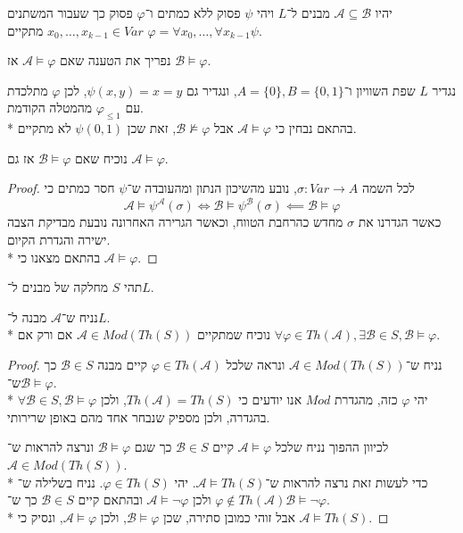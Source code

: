 \question{}
יהיו $\mathcal{A} \subseteq \mathcal{B}$ מבנים ל־$L$ ויהי $\psi$ פסוק ללא כמתים ו־$\varphi$ פסוק כך שעבור המשתנים $x_0, \dots, x_{k - 1} \in Var$ מתקיים $\varphi = \forall x_0, \dots, \forall x_{k - 1} \psi$.

\subquestion{}
נפריך את הטענה שאם $\mathcal{A} \models \varphi$ אז $\mathcal{B} \models \varphi$.
\begin{solution}
	נגדיר $L$ שפת השוויון ו־$A = \{0\}, B = \{0, 1\}$, ונגדיר גם $\psi(x, y) = x = y$, לכן $\varphi$ מתלכדת עם $\varphi_{\le 1}$ מהמטלה הקודמת. \\*
	בהתאם נבחין כי $\mathcal{A} \models \varphi$ אבל $\mathcal{B} \not\models \varphi$, זאת שכן $\psi(0, 1)$ לא מתקיים.
\end{solution}

\subquestion{}
נוכיח שאם $\mathcal{B} \models \varphi$ אז גם $\mathcal{A} \models \varphi$.
\begin{proof}
	לכל השמה $\sigma : Var \to A$, נובע מהשיכון הנתון ומהעובדה ש־$\psi$ חסר כמתים כי
	\[
		\mathcal{A} \models \psi^\mathcal{A}(\sigma)
		\iff \mathcal{B} \models \psi^\mathcal{B}(\sigma)
		\impliedby \mathcal{B} \models \varphi
	\]
	כאשר הגדרנו את $\sigma$ מחדש כהרחבת הטווח, וכאשר הגרירה האחרונה נובעת מבדיקת הצבה ישירה והגדרת הקיום. \\*
	בהתאם מצאנו כי $\mathcal{A} \models \varphi$.
\end{proof}

\question{}
תהי $S$ מחלקה של מבנים ל־$L$.

\subquestion{}
נניח ש־$\mathcal{A}$ מבנה ל־$L$. \\*
נוכיח שמתקיים $\mathcal{A} \in Mod(Th(S))$ אם ורק אם $\forall \varphi \in Th(\mathcal{A}), \exists \mathcal{B} \in S, \mathcal{B} \models \varphi$.
\begin{proof}
	נניח ש־$\mathcal{A} \in Mod(Th(S))$ ונראה שלכל $\varphi \in Th(\mathcal{A})$ קיים מבנה $\mathcal{B} \in S$ כך ש־$\mathcal{B} \models \varphi$. \\*
	יהי $\varphi$ כזה, מהגדרת $Mod$ אנו יודעים כי $Th(\mathcal{A}) = Th(S)$, ולכן $\forall \mathcal{B} \in S, \mathcal{B} \models \varphi$ בהגדרה, ולכן מספיק שנבחר אחד מהם באופן שרירותי.

	לכיוון ההפוך נניח שלכל $\mathcal{A} \models \varphi$ קיים $\mathcal{B} \in S$ כך שגם $\mathcal{B} \models \varphi$ ונרצה להראות ש־$\mathcal{A} \in Mod(Th(S))$. \\*
	כדי לעשות זאת נרצה להראות ש־$\mathcal{A} \models Th(S)$.
	יהי $\varphi \in Th(S)$. נניח בשלילה ש־$\varphi \notin Th(\mathcal{A})$ ולכן $\mathcal{A} \models \lnot \varphi$ ובהתאם קיים $\mathcal{B} \in S$ כך ש־$\mathcal{B} \models \lnot \varphi$. \\*
	אבל זוהי כמובן סתירה, שכן $\mathcal{B} \models \varphi$, ולכן $\mathcal{A} \models \varphi$, ונסיק כי $\mathcal{A} \models Th(S)$.
\end{proof}


